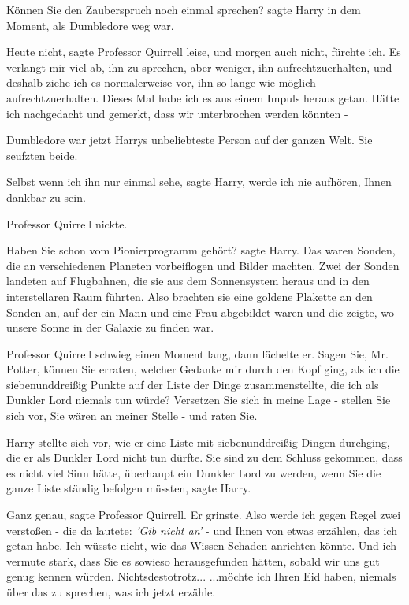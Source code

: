 \glqq{}Können Sie den Zauberspruch noch einmal sprechen?\grqq{} sagte Harry in
dem Moment, als Dumbledore weg war.

\glqq{}Heute nicht\grqq{}, sagte Professor Quirrell leise, \glqq{}und morgen auch
nicht, fürchte ich. Es verlangt mir viel ab, ihn zu sprechen, aber weniger, ihn
aufrechtzuerhalten, und deshalb ziehe ich es normalerweise vor, ihn so lange wie
möglich aufrechtzuerhalten. Dieses Mal habe ich es aus einem Impuls heraus
getan. Hätte ich nachgedacht und gemerkt, dass wir unterbrochen werden könnten
-\grqq{}

Dumbledore war jetzt Harrys unbeliebteste Person auf der ganzen Welt. Sie
seufzten beide.

\glqq{}Selbst wenn ich ihn nur einmal sehe\grqq{}, sagte Harry, \glqq{}werde ich
nie aufhören, Ihnen dankbar zu sein.\grqq{}

Professor Quirrell nickte.

\glqq{}Haben Sie schon vom Pionierprogramm gehört?\grqq{} sagte Harry. \glqq{}Das
waren Sonden, die an verschiedenen Planeten vorbeiflogen und Bilder machten.
Zwei der Sonden landeten auf Flugbahnen, die sie aus dem Sonnensystem heraus und
in den interstellaren Raum führten. Also brachten sie eine goldene Plakette an
den Sonden an, auf der ein Mann und eine Frau abgebildet waren und die zeigte,
wo unsere Sonne in der Galaxie zu finden war.\grqq{}

Professor Quirrell schwieg einen Moment lang, dann lächelte er. \glqq{}Sagen Sie,
Mr. Potter, können Sie erraten, welcher Gedanke mir durch den Kopf ging, als ich
die siebenunddreißig Punkte auf der Liste der Dinge zusammenstellte, die ich als
Dunkler Lord niemals tun würde? Versetzen Sie sich in meine Lage - stellen Sie
sich vor, Sie wären an meiner Stelle - und raten Sie.\grqq{}

Harry stellte sich vor, wie er eine Liste mit siebenunddreißig Dingen durchging,
die er als Dunkler Lord nicht tun dürfte. \glqq{}Sie sind zu dem Schluss
gekommen, dass es nicht viel Sinn hätte, überhaupt ein Dunkler Lord zu werden,
wenn Sie die ganze Liste ständig befolgen müssten\grqq{}, sagte Harry.

\glqq{}Ganz genau\grqq{}, sagte Professor Quirrell. Er grinste. \glqq{}Also werde
ich gegen Regel zwei verstoßen - die da lautete: \emph{'Gib nicht an'} - und
Ihnen von etwas erzählen, das ich getan habe. Ich wüsste nicht, wie das Wissen
Schaden anrichten könnte. Und ich vermute stark, dass Sie es sowieso
herausgefunden hätten, sobald wir uns gut genug kennen würden.
Nichtsdestotrotz... ...möchte ich Ihren Eid haben, niemals über das zu sprechen,
was ich jetzt erzähle.\grqq{}

